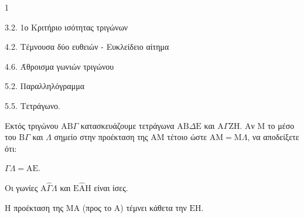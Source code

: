 \begin{ylh}{1}
    \item 3.2. 1ο Κριτήριο ισότητας τριγώνων
    \item 4.2. Τέμνουσα δύο ευθειών - Ευκλείδειο αίτημα
    \item 4.6. Άθροισμα γωνιών τριγώνου
    \item 5.2. Παραλληλόγραμμα
    \item 5.5. Τετράγωνο.
\end{ylh}
Εκτός τριγώνου $\mathrm{A}\mathrm{B}\Gamma$ κατασκευάζουμε τετράγωνα $\mathrm{A}\mathrm{B}\Delta\mathrm{E}$ και $\mathrm{A}\Gamma\mathrm{Z}\mathrm{H}$. Αν $\mathrm{M}$ το μέσο του $\mathrm{B}\Gamma$ και $\Lambda$ σημείο στην προέκταση της $\mathrm{A}\mathrm{M}$ τέτοιο ώστε $\mathrm{A}\mathrm{M} = \mathrm{M}\Lambda$, να αποδείξετε ότι:
\begin{alist}
    \item $\Gamma\Lambda = \mathrm{A}\mathrm{E}$. 
    \item Οι γωνίες $\mathrm{A}\hat{\Gamma}\Lambda$ και $\mathrm{E}\hat{\mathrm{A}}\mathrm{H}$ είναι ίσες. 
    \item Η προέκταση της $\mathrm{M}\mathrm{A}$ (προς το $\mathrm{A}$) τέμνει κάθετα την $\mathrm{E}\mathrm{H}$. 
\end{alist}
